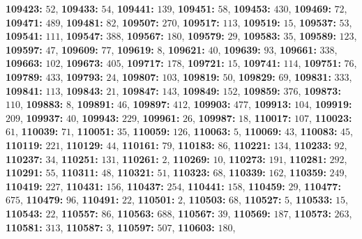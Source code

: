 \textsf{\bfseries 109423:} $52$, \textsf{\bfseries 109433:} $54$, \textsf{\bfseries 109441:} $139$, \textsf{\bfseries 109451:} $58$, \textsf{\bfseries 109453:} $430$, \textsf{\bfseries 109469:} $72$, \textsf{\bfseries 109471:} $489$, \textsf{\bfseries 109481:} $82$, \textsf{\bfseries 109507:} $270$, \textsf{\bfseries 109517:} $113$, \textsf{\bfseries 109519:} $15$, \textsf{\bfseries 109537:} $53$, \textsf{\bfseries 109541:} $111$, \textsf{\bfseries 109547:} $388$, \textsf{\bfseries 109567:} $180$, \textsf{\bfseries 109579:} $29$, \textsf{\bfseries 109583:} $35$, \textsf{\bfseries 109589:} $123$, \textsf{\bfseries 109597:} $47$, \textsf{\bfseries 109609:} $77$, \textsf{\bfseries 109619:} $8$, \textsf{\bfseries 109621:} $40$, \textsf{\bfseries 109639:} $93$, \textsf{\bfseries 109661:} $338$, \textsf{\bfseries 109663:} $102$, \textsf{\bfseries 109673:} $405$, \textsf{\bfseries 109717:} $178$, \textsf{\bfseries 109721:} $15$, \textsf{\bfseries 109741:} $114$, \textsf{\bfseries 109751:} $76$, \textsf{\bfseries 109789:} $433$, \textsf{\bfseries 109793:} $24$, \textsf{\bfseries 109807:} $103$, \textsf{\bfseries 109819:} $50$, \textsf{\bfseries 109829:} $69$, \textsf{\bfseries 109831:} $333$, \textsf{\bfseries 109841:} $113$, \textsf{\bfseries 109843:} $21$, \textsf{\bfseries 109847:} $143$, \textsf{\bfseries 109849:} $152$, \textsf{\bfseries 109859:} $376$, \textsf{\bfseries 109873:} $110$, \textsf{\bfseries 109883:} $8$, \textsf{\bfseries 109891:} $46$, \textsf{\bfseries 109897:} $412$, \textsf{\bfseries 109903:} $477$, \textsf{\bfseries 109913:} $104$, \textsf{\bfseries 109919:} $209$, \textsf{\bfseries 109937:} $40$, \textsf{\bfseries 109943:} $229$, \textsf{\bfseries 109961:} $26$, \textsf{\bfseries 109987:} $18$, \textsf{\bfseries 110017:} $107$, \textsf{\bfseries 110023:} $61$, \textsf{\bfseries 110039:} $71$, \textsf{\bfseries 110051:} $35$, \textsf{\bfseries 110059:} $126$, \textsf{\bfseries 110063:} $5$, \textsf{\bfseries 110069:} $43$, \textsf{\bfseries 110083:} $45$, \textsf{\bfseries 110119:} $221$, \textsf{\bfseries 110129:} $44$, \textsf{\bfseries 110161:} $79$, \textsf{\bfseries 110183:} $86$, \textsf{\bfseries 110221:} $134$, \textsf{\bfseries 110233:} $92$, \textsf{\bfseries 110237:} $34$, \textsf{\bfseries 110251:} $131$, \textsf{\bfseries 110261:} $2$, \textsf{\bfseries 110269:} $10$, \textsf{\bfseries 110273:} $191$, \textsf{\bfseries 110281:} $292$, \textsf{\bfseries 110291:} $55$, \textsf{\bfseries 110311:} $48$, \textsf{\bfseries 110321:} $51$, \textsf{\bfseries 110323:} $68$, \textsf{\bfseries 110339:} $162$, \textsf{\bfseries 110359:} $249$, \textsf{\bfseries 110419:} $227$, \textsf{\bfseries 110431:} $156$, \textsf{\bfseries 110437:} $254$, \textsf{\bfseries 110441:} $158$, \textsf{\bfseries 110459:} $29$, \textsf{\bfseries 110477:} $675$, \textsf{\bfseries 110479:} $96$, \textsf{\bfseries 110491:} $22$, \textsf{\bfseries 110501:} $2$, \textsf{\bfseries 110503:} $68$, \textsf{\bfseries 110527:} $5$, \textsf{\bfseries 110533:} $15$, \textsf{\bfseries 110543:} $22$, \textsf{\bfseries 110557:} $86$, \textsf{\bfseries 110563:} $688$, \textsf{\bfseries 110567:} $39$, \textsf{\bfseries 110569:} $187$, \textsf{\bfseries 110573:} $263$, \textsf{\bfseries 110581:} $313$, \textsf{\bfseries 110587:} $3$, \textsf{\bfseries 110597:} $507$, \textsf{\bfseries 110603:} $180$, 
